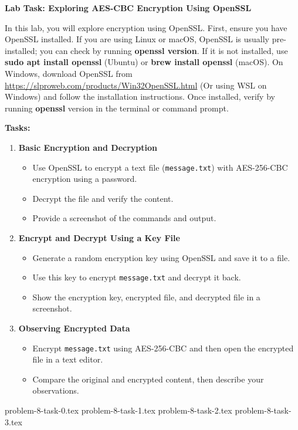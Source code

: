 \item[\textbf{Problem 8}]
\textbf{Lab Task: Exploring AES-CBC Encryption Using OpenSSL}

In this lab, you will explore encryption using OpenSSL. First, ensure you have
OpenSSL installed. If you are using Linux or macOS, OpenSSL is usually
pre-installed; you can check by running \textbf{openssl version}. If it is not
installed, use \textbf{sudo apt install openssl} (Ubuntu) or \textbf{brew
install openssl} (macOS). On Windows, download OpenSSL from
\url{https://slproweb.com/products/Win32OpenSSL.html} (Or using WSL on Windows)
and follow the installation instructions. Once installed, verify by running
\textbf{openssl} version in the terminal or command prompt.

\textbf{Tasks:}
    \begin{enumerate}
        \item \textbf{Basic Encryption and Decryption}
        \begin{itemize}
            \item Use OpenSSL to encrypt a text file (\texttt{message.txt}) with
                  AES-256-CBC encryption using a password.

            \item Decrypt the file and verify the content.
            
            \item Provide a screenshot of the commands and output.
        \end{itemize}

        \item \textbf{Encrypt and Decrypt Using a Key File}
        \begin{itemize}
            \item Generate a random encryption key using OpenSSL and save it to
                  a file.
            
            \item Use this key to encrypt \texttt{message.txt} and decrypt it
                  back.
            
            \item Show the encryption key, encrypted file, and decrypted file in
                  a screenshot.
        \end{itemize}

        \item \textbf{Observing Encrypted Data}
        \begin{itemize}
            \item Encrypt \texttt{message.txt} using AES-256-CBC and then open
                  the encrypted file in a text editor.
            
            \item Compare the original and encrypted content, then describe your
                  observations.
        \end{itemize}
    \end{enumerate}

\Solution

{problem-8-task-0.tex}
{problem-8-task-1.tex}
{problem-8-task-2.tex}
{problem-8-task-3.tex}
